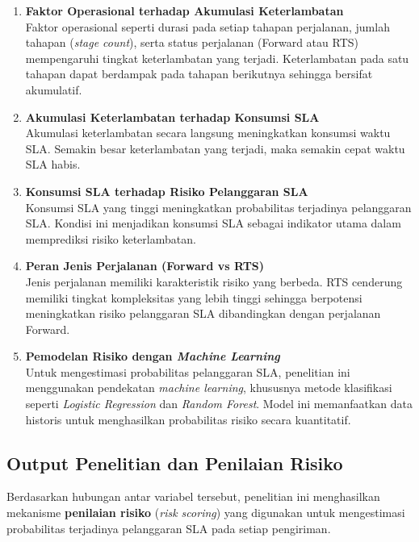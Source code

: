\begin{enumerate}
    \item \textbf{Faktor Operasional terhadap Akumulasi Keterlambatan} \\
    Faktor operasional seperti durasi pada setiap tahapan perjalanan, jumlah tahapan (\textit{stage count}), serta status perjalanan (Forward atau RTS) mempengaruhi tingkat keterlambatan yang terjadi. Keterlambatan pada satu tahapan dapat berdampak pada tahapan berikutnya sehingga bersifat akumulatif.

    \item \textbf{Akumulasi Keterlambatan terhadap Konsumsi SLA} \\
    Akumulasi keterlambatan secara langsung meningkatkan konsumsi waktu SLA. Semakin besar keterlambatan yang terjadi, maka semakin cepat waktu SLA habis.

    \item \textbf{Konsumsi SLA terhadap Risiko Pelanggaran SLA} \\
    Konsumsi SLA yang tinggi meningkatkan probabilitas terjadinya pelanggaran SLA. Kondisi ini menjadikan konsumsi SLA sebagai indikator utama dalam memprediksi risiko keterlambatan.

    \item \textbf{Peran Jenis Perjalanan (Forward vs RTS)} \\
    Jenis perjalanan memiliki karakteristik risiko yang berbeda. RTS cenderung memiliki tingkat kompleksitas yang lebih tinggi sehingga berpotensi meningkatkan risiko pelanggaran SLA dibandingkan dengan perjalanan Forward.

    \item \textbf{Pemodelan Risiko dengan \textit{Machine Learning}} \\
    Untuk mengestimasi probabilitas pelanggaran SLA, penelitian ini menggunakan pendekatan \textit{machine learning}, khususnya metode klasifikasi seperti \textit{Logistic Regression} dan \textit{Random Forest}. Model ini memanfaatkan data historis untuk menghasilkan probabilitas risiko secara kuantitatif.
\end{enumerate}

\subsection{Output Penelitian dan Penilaian Risiko}

Berdasarkan hubungan antar variabel tersebut, penelitian ini menghasilkan mekanisme \textbf{penilaian risiko} (\textit{risk scoring}) yang digunakan untuk mengestimasi probabilitas terjadinya pelanggaran SLA pada setiap pengiriman.

